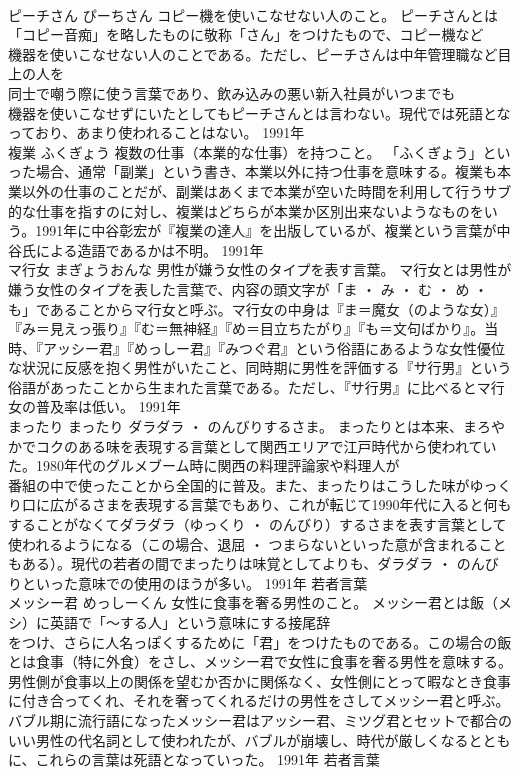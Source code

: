 \documentclass[8pt]{extreport}
\begin{document}
\begin{CJK}{UTF8}{min}
\\	ピーチさん	ぴーちさん	コピー機を使いこなせない人のこと。	ピーチさんとは「コピー音痴」を略したものに敬称「さん」をつけたもので、コピー機など
\\	機器を使いこなせない人のことである。ただし、ピーチさんは中年管理職など目上の人を
\\	同士で嘲う際に使う言葉であり、飲み込みの悪い新入社員がいつまでも
\\	機器を使いこなせずにいたとしてもピーチさんとは言わない。現代では死語となっており、あまり使われることはない。	1991年	
\\	複業	ふくぎょう	複数の仕事（本業的な仕事）を持つこと。	「ふくぎょう」といった場合、通常「副業」という書き、本業以外に持つ仕事を意味する。複業も本業以外の仕事のことだが、副業はあくまで本業が空いた時間を利用して行うサブ的な仕事を指すのに対し、複業はどちらが本業か区別出来ないようなものをいう。1991年に中谷彰宏が『複業の達人』を出版しているが、複業という言葉が中谷氏による造語であるかは不明。	1991年	
\\	マ行女	まぎょうおんな	男性が嫌う女性のタイプを表す言葉。	マ行女とは男性が嫌う女性のタイプを表した言葉で、内容の頭文字が「ま ・ み ・ む ・ め ・ も」であることからマ行女と呼ぶ。マ行女の中身は『ま＝魔女（のような女）』『み＝見えっ張り』『む＝無神経』『め＝目立ちたがり』『も＝文句ばかり』。当時、『アッシー君』『めっしー君』『みつぐ君』という俗語にあるような女性優位な状況に反感を抱く男性がいたこと、同時期に男性を評価する『サ行男』という俗語があったことから生まれた言葉である。ただし、『サ行男』に比べるとマ行女の普及率は低い。	1991年	
\\	まったり	まったり	ダラダラ ・ のんびりするさま。	まったりとは本来、まろやかでコクのある味を表現する言葉として関西エリアで江戸時代から使われていた。1980年代のグルメブーム時に関西の料理評論家や料理人が
\\	番組の中で使ったことから全国的に普及。また、まったりはこうした味がゆっくり口に広がるさまを表現する言葉でもあり、これが転じて1990年代に入ると何もすることがなくてダラダラ（ゆっくり ・ のんびり）するさまを表す言葉として使われるようになる（この場合、退屈 ・ つまらないといった意が含まれることもある）。現代の若者の間でまったりは味覚としてよりも、ダラダラ ・ のんびりといった意味での使用のほうが多い。	1991年	若者言葉	
\\	メッシー君	めっしーくん	女性に食事を奢る男性のこと。	メッシー君とは飯（メシ）に英語で「～する人」という意味にする接尾辞
\\	をつけ、さらに人名っぽくするために「君」をつけたものである。この場合の飯とは食事（特に外食）をさし、メッシー君で女性に食事を奢る男性を意味する。男性側が食事以上の関係を望むか否かに関係なく、女性側にとって暇なとき食事に付き合ってくれ、それを奢ってくれるだけの男性をさしてメッシー君と呼ぶ。バブル期に流行語になったメッシー君はアッシー君、ミツグ君とセットで都合のいい男性の代名詞として使われたが、バブルが崩壊し、時代が厳しくなるとともに、これらの言葉は死語となっていった。	1991年	若者言葉	

\end{CJK}
\end{document}
